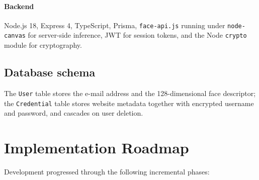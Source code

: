 \paragraph{Backend}
Node.js 18, Express 4, TypeScript, Prisma, \texttt{face-api.js} running under \texttt{node-canvas} for server-side inference, JWT for session tokens, and the Node \texttt{crypto} module for cryptography.

\subsection{Database schema}
The \texttt{User} table stores the e-mail address and the 128-dimensional face descriptor; the \texttt{Credential} table stores website metadata together with encrypted username and password, and cascades on user deletion.

\section{Implementation Roadmap}

Development progressed through the following incremental phases:

